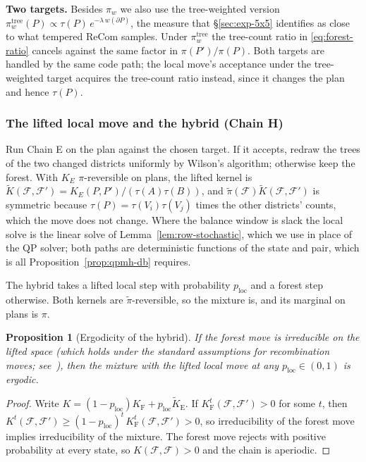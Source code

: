\documentclass[11pt]{article}
\newtheorem{proposition}{Proposition}[section]
\begin{document}
\textbf{Two targets.} Besides $\pi_w$ we also use the tree-weighted
version $\pi_w^{\mathrm{tree}}(P) \propto \tau(P)\, e^{-\lambda\, w(\partial P)}$,
the measure that \S\ref{sec:exp-5x5} identifies as close to what
tempered ReCom samples. Under $\pi_w^{\mathrm{tree}}$ the tree-count
ratio in \eqref{eq:forest-ratio} cancels against the same factor in
$\pi(P')/\pi(P)$. Both targets are handled by the same code path; the
local move's acceptance under the tree-weighted target acquires the
tree-count ratio instead, since it changes the plan and hence
$\tau(P)$.

\subsubsection{The lifted local move and the hybrid (Chain H)}\label{sec:lifted-local}

Run Chain E on the plan against the chosen target. If it accepts,
redraw the trees of the two changed districts uniformly by Wilson's
algorithm; otherwise keep the forest. With $K_E$ $\pi$-reversible on
plans, the lifted kernel is
$\tilde K(\mathcal{F}, \mathcal{F}') = K_E(P, P') / (\tau(A)\tau(B))$,
and $\tilde\pi(\mathcal{F})\tilde K(\mathcal{F}, \mathcal{F}')$ is
symmetric because $\tau(P) = \tau(V_i)\tau(V_j)$ times the other
districts' counts, which the move does not change. Where the balance
window is slack the local solve is the linear solve of
Lemma~\ref{lem:row-stochastic}, which we use in place of the QP
solver; both paths are deterministic functions of the state and pair,
which is all Proposition~\ref{prop:qpmh-db} requires.

The hybrid takes a lifted local step with probability
$p_{\mathrm{loc}}$ and a forest step otherwise. Both kernels are
$\tilde\pi$-reversible, so the mixture is, and its marginal on plans
is $\pi$.

\begin{proposition}[Ergodicity of the hybrid]\label{prop:ergodic}
If the forest move is irreducible on the lifted space (which holds
under the standard assumptions for recombination moves;
see~\cite{deford2021recombination,cannon2024irreducibility,autry2023metropolized}),
then the mixture with the lifted local move at any
$p_{\mathrm{loc}} \in (0, 1)$ is ergodic.
\end{proposition}

\begin{proof}
Write $K = (1 - p_{\mathrm{loc}}) K_{\mathrm{F}} + p_{\mathrm{loc}}
\tilde K_{\mathrm{E}}$. If $K_{\mathrm{F}}^{t}(\mathcal{F}, \mathcal{F}') > 0$
for some $t$, then
$K^{t}(\mathcal{F}, \mathcal{F}') \ge (1 - p_{\mathrm{loc}})^{t}\,
K_{\mathrm{F}}^{t}(\mathcal{F}, \mathcal{F}') > 0$, so irreducibility
of the forest move implies irreducibility of the mixture. The forest
move rejects with positive probability at every state, so
$K(\mathcal{F}, \mathcal{F}) > 0$ and the chain is aperiodic.
\end{proof}
\end{document}
